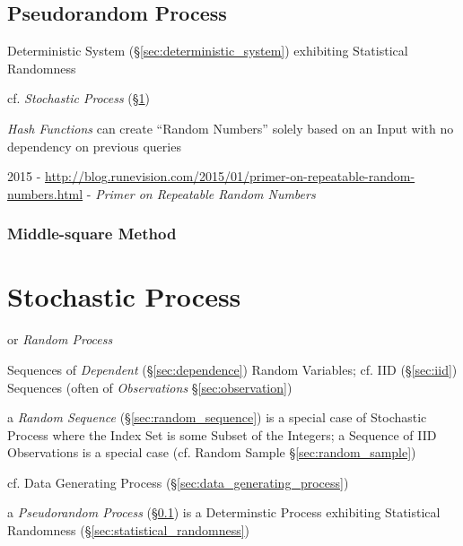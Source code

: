 \subsection{Pseudorandom Process}\label{sec:pseudorandom_process}

Deterministic System (\S\ref{sec:deterministic_system}) exhibiting Statistical
Randomness

cf. \emph{Stochastic Process} (\S\ref{sec:stochastic_process})

\emph{Hash Functions} can create ``Random Numbers'' solely based on an Input
with no dependency on previous queries

2015 -
\url{http://blog.runevision.com/2015/01/primer-on-repeatable-random-numbers.html}
- \emph{Primer on Repeatable Random Numbers}



\subsubsection{Middle-square Method}\label{sec:middle_square_method}



\section{Stochastic Process}\label{sec:stochastic_process}

or \emph{Random Process}

Sequences of \emph{Dependent} (\S\ref{sec:dependence}) Random Variables; cf. IID
(\S\ref{sec:iid}) Sequences (often of \emph{Observations}
\S\ref{sec:observation})

\fist a \emph{Random Sequence} (\S\ref{sec:random_sequence}) is a special case
of Stochastic Process where the Index Set is some Subset of the Integers; a
Sequence of IID Observations is a special case (cf. Random Sample
\S\ref{sec:random_sample})

\fist cf. Data Generating Process (\S\ref{sec:data_generating_process})

\fist a \emph{Pseudorandom Process} (\S\ref{sec:pseudorandom_process}) is a
Determinstic Process exhibiting Statistical Randomness
(\S\ref{sec:statistical_randomness})

